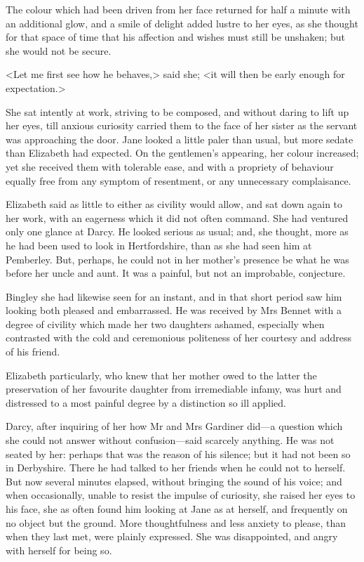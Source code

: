 The colour which had been driven from her face returned for half a minute with an additional glow, and a smile of delight added lustre to her eyes, as she thought for that space of time that his affection and wishes must still be unshaken; but she would not be secure.

<Let me first see how he behaves,> said she; <it will then be early enough for expectation.>

She sat intently at work, striving to be composed, and without daring to lift up her eyes, till anxious curiosity carried them to the face of her sister as the servant was approaching the door. Jane looked a little paler than usual, but more sedate than Elizabeth had expected. On the gentlemen's appearing, her colour increased; yet she received them with tolerable ease, and with a propriety of behaviour equally free from any symptom of resentment, or any unnecessary complaisance.

Elizabeth said as little to either as civility would allow, and sat down again to her work, with an eagerness which it did not often command. She had ventured only one glance at Darcy. He looked serious as usual; and, she thought, more as he had been used to look in Hertfordshire, than as she had seen him at Pemberley. But, perhaps, he could not in her mother's presence be what he was before her uncle and aunt. It was a painful, but not an improbable, conjecture.

Bingley she had likewise seen for an instant, and in that short period saw him looking both pleased and embarrassed. He was received by Mrs Bennet with a degree of civility which made her two daughters ashamed, especially when contrasted with the cold and ceremonious politeness of her courtesy and address of his friend.

Elizabeth particularly, who knew that her mother owed to the latter the preservation of her favourite daughter from irremediable infamy, was hurt and distressed to a most painful degree by a distinction so ill applied.

Darcy, after inquiring of her how Mr and Mrs Gardiner did—a question which she could not answer without confusion—said scarcely anything. He was not seated by her: perhaps that was the reason of his silence; but it had not been so in Derbyshire. There he had talked to her friends when he could not to herself. But now several minutes elapsed, without bringing the sound of his voice; and when occasionally, unable to resist the impulse of curiosity, she raised her eyes to his face, she as often found him looking at Jane as at herself, and frequently on no object but the ground. More thoughtfulness and less anxiety to please, than when they last met, were plainly expressed. She was disappointed, and angry with herself for being so.

